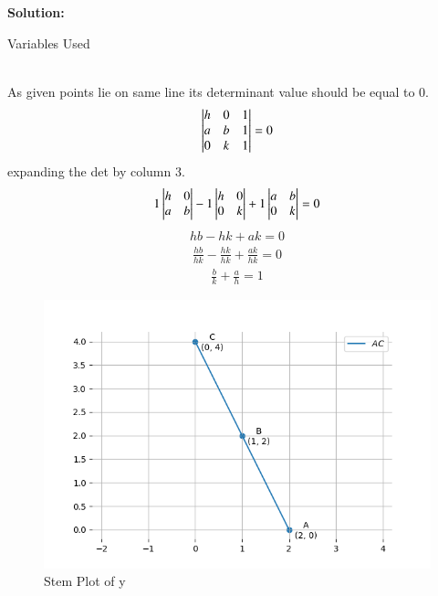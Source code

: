 \documentclass[journal]{IEEEtran}
\begin{document}
\textbf{Solution: }
\begin{table}[h!]    
  \centering
  
  \caption{Variables Used}
  \label{tab10.5.3.9.1}
\end{table}\\
As given points lie on same line its determinant value should be equal to 0.
\begin{align}
 \begin{vmatrix}h & 0 & 1 \\ a & b & 1 \\ 0 & k & 1\end{vmatrix} = 0 \label{1.6.9.1}
\end{align}
expanding the det by column 3.
\begin{align}
 1\begin{vmatrix}h & 0 \\ a & b\end{vmatrix} - 1\begin{vmatrix} h & 0 \\ 0 & k \end{vmatrix} + 1\begin{vmatrix} a & b \\ 0 & k \end{vmatrix} = 0
\end{align}
\begin{align}
 hb - hk + ak = 0
\end{align}
\begin{align}
 \frac{hb}{hk} - \frac{hk}{hk} + \frac{ak}{hk} = 0
\end{align}
\begin{align}
 \frac{b}{k} + \frac{a}{h} = 1
\end{align}
\begin{figure}[h!]
   \centering
   \includegraphics[width=0.7\linewidth]{figs/fig2.png}
   \caption{Stem Plot of y}
   \label{stemplot}
\end{figure}
\end{document}

